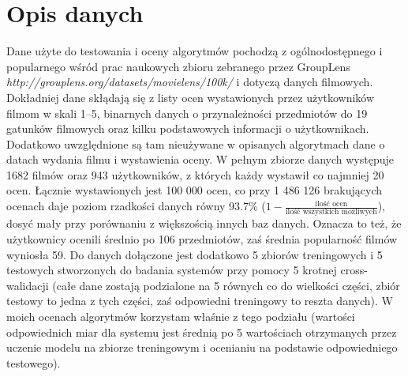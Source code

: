 \documentclass{pracamgr}
\begin{document}
  \section{Opis danych}
   Dane użyte do testowania i oceny algorytmów pochodzą z ogólnodostępnego i popularnego wśród prac naukowych
   zbioru zebranego przez GroupLens\newline
   \textit{http://grouplens.org/datasets/movielens/100k/} i dotyczą danych filmowych.\newline
   Dokładniej dane skłądają się z listy ocen wystawionych przez użytkowników filmom w skali 1--5,
   binarnych danych o przynależności przedmiotów do 19 gatunków filmowych oraz kilku podstawowych informacji o użytkownikach.
   Dodatkowo uwzględnione są tam nieużywane w opisanych algorytmach dane o datach wydania filmu i wystawienia oceny.
   W pełnym zbiorze danych występuje 1682 filmów oraz 943 użytkowników, z których każdy wystawił co najmniej 20 ocen.
   Łącznie wystawionych jest 100 000 ocen, co przy 1 486 126 brakujących ocenach daje poziom rzadkości danych równy 93.7\%
   ($1-\frac{\text{ilość ocen}}{\text{ilość wszystkich możliwych}}$), dosyć mały przy porównaniu z większością innych baz danych.
   Oznacza to też, że użytkownicy ocenili średnio po 106 przedmiotów, zaś średnia popularność filmów wyniosła 59.
   Do danych dołączone jest dodatkowo 5 zbiorów treningowych i 5 testowych stworzonych do badania systemów przy pomocy 5 krotnej cross-walidacji
   (całe dane zostają podzialone na 5 równych co do wielkości części, zbiór testowy to jedna z tych części, zaś odpowiedni treningowy to reszta danych).
   W moich ocenach algorytmów korzystam właśnie z tego podziału (wartości odpowiednich miar dla systemu jest średnią po 5 wartościach
   otrzymanych przez uczenie modelu na zbiorze treningowym i ocenianiu na podstawie odpowiedniego testowego).
\end{document}
